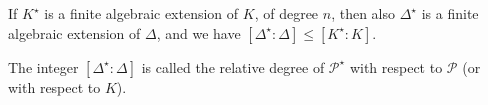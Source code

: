 If $K^\star$ is a finite algebraic extension of $K$, of degree $n$, then also $\Delta^\star$ is a finite algebraic extension of $\Delta$, and we have $[\Delta^\star:\Delta] \leq [K^\star:K]$.

The integer $[\Delta^\star:\Delta]$ is called the relative degree of $\mathcal{P}^\star$ with respect to $\mathcal{P}$ (or with respect to $K$).